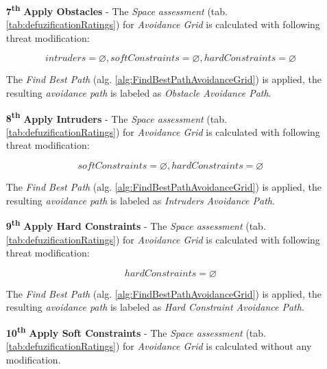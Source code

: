 \begin{itemize}
    
    \item[\textbf{7\textsuperscript{th}}] \textbf{Apply Obstacles} - The \emph{Space assessment} (tab. \ref{tab:defuzificationRatings}) for \emph{Avoidance Grid} is calculated  with following threat modification:
    
    \begin{equation*}
        intruders = \varnothing, soft Constraints = \varnothing, hard Constraints = \varnothing
    \end{equation*}
    
    The \emph{Find Best Path} (alg. \ref{alg:FindBestPathAvoidanceGrid}) is applied, the resulting \emph{avoidance path} is labeled as \emph{Obstacle Avoidance Path}.
    
    \item[\textbf{8\textsuperscript{th}}] \textbf{Apply Intruders} - The \emph{Space assessment} (tab. \ref{tab:defuzificationRatings}) for \emph{Avoidance Grid} is calculated  with following threat modification:
    
    \begin{equation*}
        soft Constraints = \varnothing, hard Constraints = \varnothing
    \end{equation*}
    
    The \emph{Find Best Path} (alg. \ref{alg:FindBestPathAvoidanceGrid}) is applied, the resulting \emph{avoidance path} is labeled as \emph{Intruders Avoidance Path}.
    
    \item[\textbf{9\textsuperscript{th}}] \textbf{Apply Hard Constraints} - The \emph{Space assessment} (tab. \ref{tab:defuzificationRatings}) for \emph{Avoidance Grid} is calculated  with following threat modification:
    
    \begin{equation*}
        hard Constraints = \varnothing
    \end{equation*}
    
    The \emph{Find Best Path} (alg. \ref{alg:FindBestPathAvoidanceGrid}) is applied, the resulting \emph{avoidance path} is labeled as \emph{Hard Constraint Avoidance Path}.
    
    \item[\textbf{10\textsuperscript{th}}] \textbf{Apply Soft Constraints} - The \emph{Space assessment} (tab. \ref{tab:defuzificationRatings}) for \emph{Avoidance Grid} is calculated  without any modification.
    

\end{itemize}
